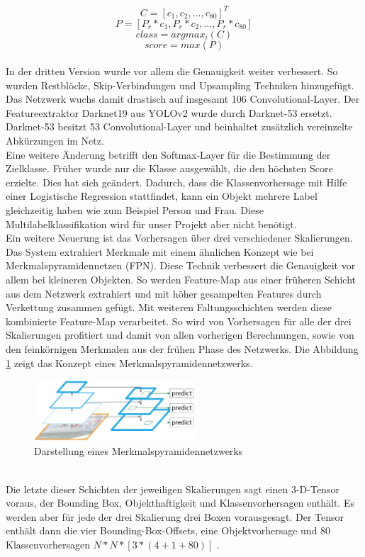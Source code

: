 \documentclass[conference]{IEEEtran}
\begin{document}
	\[ C = [c_1, c_2,..., c_{80}]^T\]
	\[ P = [P_r * c_1, P_r * c_2, ..., P_r * c_{80}] \]
	\[ class = argmax_i(C)\]
	\[ score = max(P)\]\\
	In der dritten Version wurde vor allem die Genauigkeit weiter verbessert. So wurden Restblöcke, Skip-Verbindungen und Upsampling Techniken hinzugefügt. Das Netzwerk wuchs damit drastisch auf insgesamt 106 Convolutional-Layer.
	Der Featureextraktor Darknet19 aus YOLOv2 wurde durch Darknet-53 ersetzt. Darknet-53 besitzt 53 Convolutional-Layer und beinhaltet zusätzlich vereinzelte Abkürzungen im Netz.\\
	Eine weitere Änderung betrifft den Softmax-Layer für die Bestimmung der Zielklasse. Früher wurde nur die Klasse ausgewählt, die den höchsten Score erzielte. Dies hat sich geändert. Dadurch, dass die Klassenvorhersage mit Hilfe einer Logistische Regression stattfindet, kann ein Objekt mehrere Label gleichzeitig haben wie zum Beispiel Person und Frau. Diese Multilabelklassifikation wird für unser Projekt aber nicht benötigt.\\
	Ein weitere Neuerung ist das Vorhersagen über drei verschiedener Skalierungen. Das System extrahiert Merkmale mit einem ähnlichen Konzept wie bei Merkmalspyramidennetzen (FPN)\cite{b6}. Diese Technik verbessert die Genauigkeit vor allem bei kleineren Objekten. So werden Feature-Map aus einer früheren Schicht aus dem Netzwerk extrahiert und mit höher gesampelten Features durch Verkettung zusammen gefügt. Mit weiteren Faltungsschichten werden diese kombinierte Feature-Map verarbeitet. So wird von Vorhersagen für alle der drei Skalierungen profitiert und damit von allen vorherigen Berechnungen, sowie von den feinkörnigen Merkmalen aus der frühen Phase des Netzwerks. Die Abbildung \ref{FPN} zeigt das Konzept eines Merkmalspyramidennetzwerks.
	\begin{figure}[!h]
		\begin{center}
			\includegraphics[width=6cm]{Media/FPN.png}
			\caption{Darstellung eines Merkmalspyramidennetzwerks \cite{b6}}
			\label{FPN}
		\end{center}
	\end{figure}\\
	Die letzte dieser Schichten der jeweiligen Skalierungen sagt einen 3-D-Tensor voraus, der Bounding Box, Objekthaftigkeit und Klassenvorhersagen enthält. Es werden aber für jede der drei Skalierung drei Boxen vorausgesagt. Der Tensor enthält dann die vier Bounding-Box-Offsets, eine Objektvorhersage und 80 Klassenvorhersagen $N*N*[3*(4 + 1 + 80)]$ \cite{b4}.\\
\end{document}

